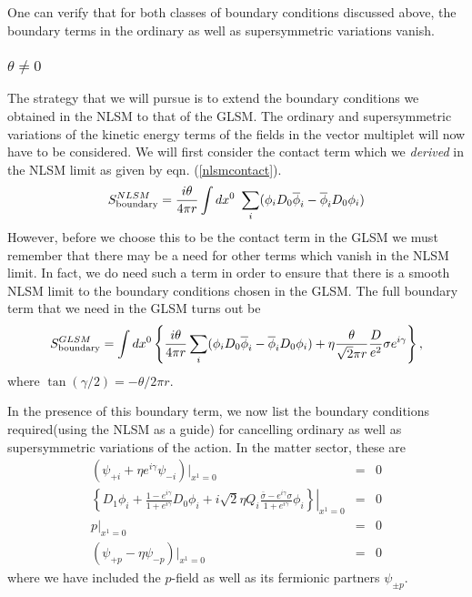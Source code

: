 \documentclass[a4paper,12pt]{article}
\begin{document}
One can verify that for both classes of boundary conditions discussed
above, the boundary terms in the ordinary as well as supersymmetric 
variations vanish. 


\subsubsection{$\theta\neq 0$}

The strategy that we will pursue is to extend the boundary conditions
we obtained in the NLSM to that of the GLSM. The ordinary and
supersymmetric variations of the kinetic energy terms of the fields in
the vector multiplet will now have to be considered. We will first
consider the contact term which we {\it derived} in the NLSM limit
as given by eqn. (\ref{nlsmcontact}).
\begin{equation}
S^{NLSM}_{\rm boundary}= {{i\theta}\over{4\pi r}} \int dx^0\ 
\sum_i (\phi_i D_0\overline{\phi}_i - \overline{\phi}_iD_0 \phi_i)
\end{equation}
However, before we choose this to be the contact term in the GLSM we
must remember that there may be a need for other terms which vanish in the
NLSM limit. In fact, we do need such a term in order to ensure that
there is a smooth NLSM limit to the boundary conditions chosen in
the GLSM. The full boundary term that  we need in the GLSM turns out be
\begin{equation}
S^{GLSM}_{\rm boundary}= \int dx^0\left\{ {{i\theta}\over{4\pi r}} 
\sum_i (\phi_i D_0\overline{\phi}_i - \overline{\phi}_iD_0 \phi_i)
+ \eta{{\theta}\over{\sqrt{2}\pi r}} {D\over{e^2}}\sigma e^{i\gamma}
\right\}\label{boundterm},
\end{equation}
where $\tan (\gamma/2)=-\theta/2\pi r$.

In the presence of this boundary term, we now list the boundary conditions 
required(using the NLSM as a guide) for cancelling 
ordinary as well as supersymmetric variations of the action. In the
matter sector, these are
\begin{eqnarray}
(\psi_{+i}+\eta e^{i\gamma}\psi_{-i})|_{x^1=0}&=&0\\
\left.\left\{D_1\phi_i+\frac{1-e^{i\gamma}}{1+e^{i\gamma}}
D_0\phi_i+i{\sqrt 2}\eta
Q_i \frac{{\bar \sigma}-e^{i\gamma}\sigma}{1+e^{i\gamma}}\phi_i
\right\}\right|_{x^1=0}&=&0 \label{modbose}\\
p|_{x^1=0}&=&0 \\
(\psi_{+p}-\eta \psi_{-p})|_{x^1=0}&=&0
\end{eqnarray}
where we have included the $p$-field as well as its fermionic partners
$\psi_{\pm p}$.
\end{document}
